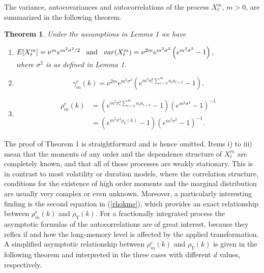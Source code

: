 \documentclass[12pt]{article}
\newtheorem{theorem}{Theorem}
\begin{document}
The variance, autocovariances and autocorrelations of the process $X_t^m$, $m>0$, are summarized in the following theorem.       
\begin{theorem}
Under the assumptions in Lemma 1 we have
%
\begin{enumerate}
\item[\rm i)]\hspace{3cm} $E[X_{t}^m]=\nu^me^{m^{2}\sigma^{2}/2}  \,\,\, \mbox{ {\rm and} } \,\,\,
var(X_{t}^m)=\nu^{2m}e^{m^2\sigma^{2}}\left(e^{m^2\sigma^{2}}-1\right),$\\
where $\sigma^2$ is as defined in Lemma 1.
%
\item[\rm ii)]
\[
\gamma_{m}^e(k)=\nu^{2m}e^{m^2\sigma^{2}}\left(e^{m^2\sigma_{\epsilon}^{2}\sum\limits_{i=0}^{\infty}a_{i}a_{i+k}}  -1\right)  .
\]
%
\item[\rm iii)]
\begin{align}\label{rhokme}
\rho_{m}^e(k) &=\left( e^{m^2\sigma_{\epsilon}^{2}\sum\limits_{i=0}^{\infty}a_{i}a_{i+k}} -1\right)  \left(  e^{m^2\sigma^{2}}-1\right)^{-1}\nonumber\\
 &=\left( e^{m^2\sigma^2\rho_Y(k)}  -1\right)  \left(  e^{m^2\sigma^{2}}-1\right)^{-1}.
\end{align}
\end{enumerate}
\end{theorem}
%
The proof of Theorem 1 is straightforward and is hence omitted. Items i) to iii) mean that the moments of any order
and the dependence structure of $X_{t}^m$ are completely
known, and that all of those processes are weakly stationary. This is in contrast to
most volatility or duration models, where the correlation structure, conditions for the existence of high
order moments and the marginal distribution
are usually very complex or even unknown. Moreover, a particularly interesting finding is the second equation in (\ref{rhokme}), which provides an exact relationship between $\rho_{m}^e(k)$ and $\rho_Y(k)$. For a fractionally integrated process the asymptotic formulas of the autocorrelations are of great interest, because they reflex if and how the long-memory level is affected by the applied transformation. A simplified asymptotic relationship between $\rho_{m}^e(k)$ and $\rho_Y(k)$ is given in the following theorem and interpreted in the three cases with different $d$ values, respectively.


\end{document}
